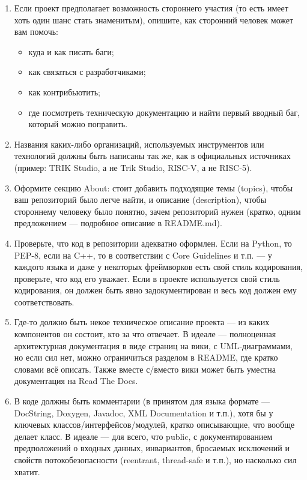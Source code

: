 \documentclass[a5paper]{article}
\begin{document}
\begin{enumerate}
    \item Если проект предполагает возможность стороннего участия (то есть имеет хоть один шанс стать знаменитым), опишите, как сторонний человек может вам помочь:
    \begin{itemize}
        \item куда и как писать баги;
        \item как связаться с разработчиками;
        \item как контрибьютить;
        \item где посмотреть техническую документацию и найти первый вводный баг, который можно поправить.
    \end{itemize}
    \item Названия каких-либо организаций, используемых инструментов или технологий должны быть написаны так же, как в официальных источниках (пример: TRIK Studio, а не Trik Studio, RISC-V, а не RISC-5).
    \item Оформите секцию About: стоит добавить подходящие темы (topics), чтобы ваш репозиторий было легче найти, и описание (description), чтобы стороннему человеку было понятно, зачем репозиторий нужен (кратко, одним предложением --- подробное описание в README.md).
    \item Проверьте, что код в репозитории адекватно оформлен. Если на Python, то PEP-8, если на C++, то в соответствии с Core Guidelines и т.п. --- у каждого языка и даже у некоторых фреймворков есть свой стиль кодирования, проверьте, что код его уважает. Если в проекте используется свой стиль кодирования, он должен быть явно задокументирован и весь код должен ему соответствовать.
    \item Где-то должно быть некое техническое описание проекта --- из каких компонентов он состоит, кто за что отвечает. В идеале --- полноценная архитектурная документация в виде страниц на вики, с UML-диаграммами, но если сил нет, можно ограничиться разделом в README, где кратко словами всё описать. Также вместе с/вместо вики может быть уместна документация на Read The Docs.
    \item В коде должны быть комментарии (в принятом для языка формате --- DocString, Doxygen, Javadoc, XML Documentation и т.п.), хотя бы у ключевых классов/интерфейсов/модулей, кратко описывающие, что вообще делает класс. В идеале --- для всего, что public, с документированием предположений о входных данных, инвариантов, бросаемых исключений и свойств потокобезопасности (reentrant, thread-safe и т.п.), но насколько сил хватит.
    \begin{itemize}

\end{itemize}
\end{enumerate}
\end{document}
